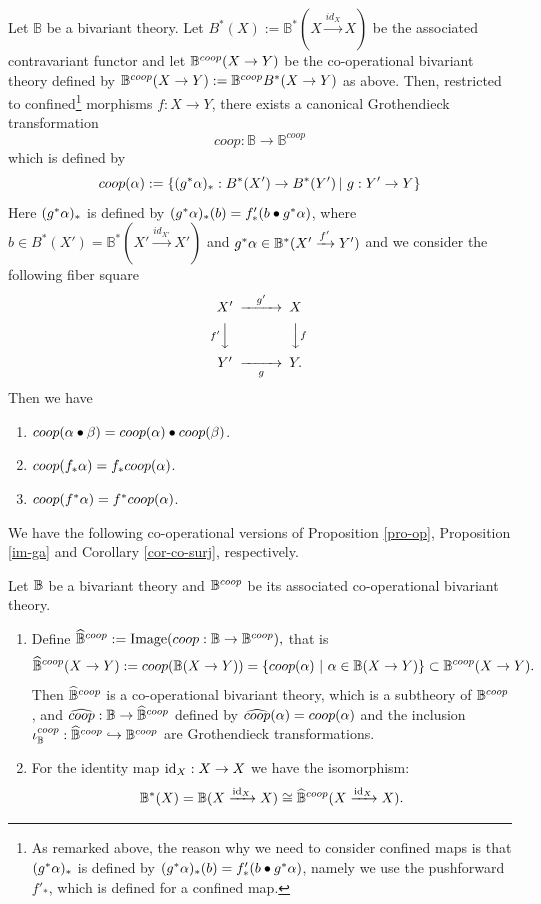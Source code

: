 \documentclass[a4paper]{amsart}
\begin{document}
\begin{pro} Let $\mathbb B$ be a bivariant theory. Let $B^*(X):=\mathbb B^*(X \xrightarrow {id_X} X)$ be the associated contravariant functor and let $\mathbb B^{coop}(X \to Y)$ be the co-operational bivariant theory defined by $\mathbb B^{coop}(X \to Y) :=\mathbb B^{coop}B^*(X \to Y)$ as above. Then, restricted to confined\footnote{As remarked above, the reason why we need to consider confined maps is that $(g^*\alpha)_*$ is defined by $(g^*\alpha)_*(b)= f'_*(b \bullet g^*\alpha)$, namely we use the pushforward $f'_*$, which is defined for a confined map.} morphisms $f:X \to Y$, there exists a canonical Grothendieck transformation
$$coop: \mathbb B \to \mathbb B^{coop}$$
which is defined by
$${coop} (\alpha) := \left \{ (g^*\alpha)_*:B^*(X') \to B^*(Y') \, | \, \, g:Y' \to Y \right \}$$
Here $(g^*\alpha)_*$ is defined by $(g^*\alpha)_*(b)= f'_*(b \bullet g^*\alpha)$, where $b \in B^*(X')=\mathbb B^*(X' \xrightarrow {id_{X'}} X')$ and $g^*\alpha \in \mathbb B^*(X' \xrightarrow {f'} Y')$ and we consider the following fiber square
$$\CD
X' @> {g'}  >> X\\
@V {f'} VV @VV fV\\
Y' @>> {g} > Y.\\
\endCD
$$
Then we have
\begin{enumerate}
\item $coop(\alpha \bullet \beta)= coop(\alpha) \bullet coop(\beta)$.
\item $coop(f_*\alpha)= f_*coop(\alpha)$.
\item $coop(f^*\alpha)= f^*coop(\alpha)$.
\end{enumerate}
\end{pro}
We have the following co-operational versions of Proposition \ref{pro-op}, Proposition \ref{im-ga} 
and Corollary \ref{cor-co-surj}, respectively.
\begin{pro}\label{pro-coop} Let $\mathbb B$ be a bivariant theory and $\mathbb B^{coop}$ be its associated co-operational bivariant theory.
\begin{enumerate}
\item Define
$\widehat{\mathbb B}^{coop}:= \operatorname{Image}(coop:\mathbb B \to \mathbb B^{coop}),$
that is 
$$\widehat{\mathbb B}^{coop}(X \to Y) := coop(\mathbb B(X \to Y))  = \left \{coop(\alpha) \, \, | \, \, \alpha \in \mathbb B(X \to Y) \right \} \subset \mathbb B^{coop}(X \to Y).$$
Then $\widehat{\mathbb B}^{coop}$ is a co-operational bivariant theory, which is a subtheory of $\mathbb B^{coop}$, and 
$\widehat{coop}: \mathbb B \to \widehat{\mathbb B}^{coop}$ defined by $\widehat{coop}(\alpha) = coop(\alpha)$ and the inclusion 
$\iota^{coop}_{\mathbb B}:\widehat{\mathbb B}^{coop} \hookrightarrow \mathbb B^{coop}$ are Grothendieck transformations.
\item \label{X-to-X-coop} For the identity map $\operatorname{id}_X:X \to X$ we have the isomorphism:
$$\mathbb B^*(X) = \mathbb B(X \xrightarrow {\operatorname{id}_X} X) \cong \widehat{\mathbb B}^{coop} (X \xrightarrow {\operatorname{id}_X} X).$$
\end{enumerate}
\end{pro}
\end{document}
